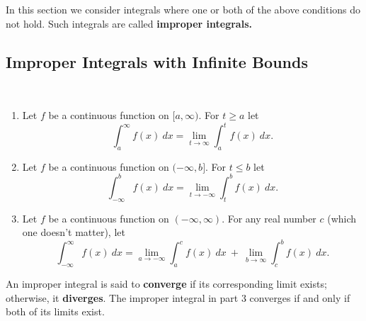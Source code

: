 In this section we consider integrals where one or both of the above conditions do not hold. Such integrals are called \textbf{improper integrals.}

\clearpage

\subsection{Improper Integrals with Infinite Bounds}

\begin{definition}\label{def:imp_int1}
\mbox{}\\[-2\baselineskip]\parbox[t]{\linewidth}{%
\begin{enumerate}
\item		Let $f$ be a continuous function on $[a,\infty)$. For $t \geq a$ let \[\int_a^\infty f(x)\ dx = \lim_{t\to\infty}\int_a^t f(x)\ dx.\]

\item		Let $f$ be a continuous function on $(-\infty,b]$. For $t \leq b$ let
\[\int_{-\infty}^b f(x)\ dx = \lim_{t\to-\infty}\int_t^b f(x)\ dx.\]

\item		Let $f$ be a continuous function on $(-\infty,\infty)$. For any real number $c$ (which one doesn't matter), let
\[
\int_{-\infty}^\infty f(x)\ dx
= \lim_{a\to-\infty}\int_a^c f(x)\ dx\ +\ \lim_{b\to\infty}\int_c^b f(x)\ dx.
\]
\end{enumerate}}
\end{definition}

An improper integral is said to \textbf{converge} if its corresponding limit exists; otherwise, it \textbf{diverges}. The improper integral in part 3 converges if and only if both of its limits exist.


